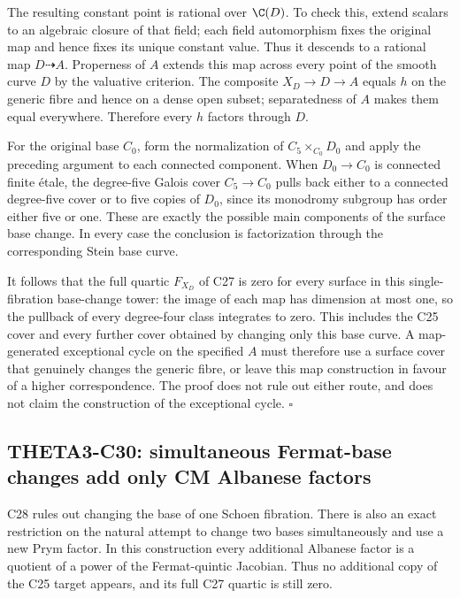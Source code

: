 \documentclass[11pt]{article}
\theoremstyle{definition}\newtheorem{definition}[theorem]{Definition}\newtheorem{remark}[theorem]{Remark}
\begin{document}
The resulting constant point is rational over
$\C(D)$.  To check this, extend scalars to an algebraic
closure of that field; each field automorphism fixes
the original map and hence fixes its unique constant
value.  Thus it descends to a rational map $D\dashrightarrow A$.
Properness of $A$ extends this map across every point
of the smooth curve $D$ by the valuative criterion.
The composite $X_D\to D\to A$ equals $h$ on the
generic fibre and hence on a dense open subset;
separatedness of $A$ makes them equal everywhere.
Therefore every $h$ factors through $D$.

For the original base $C_0$, form the normalization
of $C_5\times_{C_0}D_0$ and apply the preceding
argument to each connected component.  When
$D_0\to C_0$ is connected finite \'etale, the
degree-five Galois cover $C_5\to C_0$ pulls back
either to a connected degree-five cover or to five
copies of $D_0$, since its monodromy subgroup has
order either five or one.  These are exactly the
possible main components of the surface base change.
In every case the conclusion is factorization through
the corresponding Stein base curve.

It follows that the full quartic $F_{X_D}$ of C27
is zero for every surface in this single-fibration
base-change tower: the image of each map has dimension
at most one, so the pullback of every degree-four
class integrates to zero.  This includes the C25
cover and every further cover obtained by changing
only this base curve.  A map-generated exceptional
cycle on the specified $A$ must therefore use a
surface cover that genuinely changes the generic
fibre, or leave this map construction in favour of
a higher correspondence.  The proof does not rule
out either route, and does not claim the construction
of the exceptional cycle. \hfill$\square$


\subsection{THETA3-C30: simultaneous Fermat-base changes add only CM Albanese factors}\label{C30}

C28 rules out changing the base of one Schoen fibration.
There is also an exact restriction on the natural attempt
to change two bases simultaneously and use a new Prym
factor.  In this construction every additional Albanese
factor is a quotient of a power of the Fermat-quintic
Jacobian.  Thus no additional copy of the C25 target
appears, and its full C27 quartic is still zero.
\end{document}

